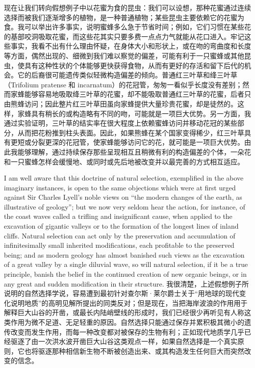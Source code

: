 {现在让我们转向假想例子中以花蜜为食的昆虫：我们可以设想，那种花蜜通过连续选择而被我们逐渐增多的植物，是一种普通植物；某些昆虫主要依赖它的花蜜为食。我可以举出许多事实，说明蜜蜂多么急于节省时间；例如，它们习惯在某些花的基部咬洞吸取花蜜，而这些花其实只要多费一点点力气就能从花口进入。牢记这些事实，我看不出有什么理由怀疑，在身体大小和形状上，或在吻的弯曲度和长度等方面，偶然出现的、细微到我们难以察觉的偏差，可能有利于一只蜜蜂或其他昆虫，使具有这种性状的个体能够更快获得食物，从而有更好的存活和留下后代的机会。它的后裔很可能遗传类似轻微构造偏差的倾向。普通红三叶草和绛三叶草（Trifolium pratense 和 incarnatum）的花冠管，匆匆一看似乎长度没有差别；然而家蜂能够容易地吸取绛三叶草的花蜜，却不能吸取普通红三叶草的花蜜，后者只由熊蜂访问；因此整片红三叶草田虽向家蜂提供大量珍贵花蜜，却是徒然的。这样，家蜂具有稍长的或构造略有不同的吻，可能就是一项巨大优势。另一方面，我通过实验证明，三叶草的结实率在很大程度上依赖蜜蜂访问并移动花冠的某些部分，从而把花粉推到柱头表面。因此，如果熊蜂在某个国家变得稀少，红三叶草具有更短或分裂更深的花冠管，使家蜂能够访问它的花，就可能是一项巨大优势。由此我能够理解，通过持续保存那些呈现相互且稍微有利的构造偏差的个体，一朵花和一只蜜蜂怎样会缓慢地、或同时或先后地被改变并以最完善的方式相互适应。}

\darwinpair
{I am well aware that this doctrine of natural selection, exemplified in the above imaginary instances, is open to the same objections which were at first urged against Sir Charles Lyell's noble views on “the modern changes of the earth, as illustrative of geology”; but we now very seldom hear the action, for instance, of the coast waves called a trifling and insignificant cause, when applied to the excavation of gigantic valleys or to the formation of the longest lines of inland cliffs. Natural selection can act only by the preservation and accumulation of infinitesimally small inherited modifications, each profitable to the preserved being; and as modern geology has almost banished such views as the excavation of a great valley by a single diluvial wave, so will natural selection, if it be a true principle, banish the belief in the continued creation of new organic beings, or in any great and sudden modification in their structure.}
{我很清楚，上述假想例子所说明的自然选择学说，容易遭到最初针对查尔斯·莱尔爵士关于“用地球的现代变化说明地质”的高明见解所提出的同类反对；但是现在，当把海岸波浪的作用用于解释巨大山谷的开凿，或最长内陆峭壁线的形成时，我们已经很少再听见有人称这类作用为微不足道、无足轻重的原因。自然选择只能通过保存并累积极其微小的遗传改变而发生作用，而每一种改变都对被保存的生物有利；正如现代地质学几乎已经驱逐了由一次洪水波开凿巨大山谷这类观点一样，如果自然选择是一个真实原则，它也将驱逐那种相信新生物不断被创造出来、或其构造发生任何巨大而突然改变的信念。}

